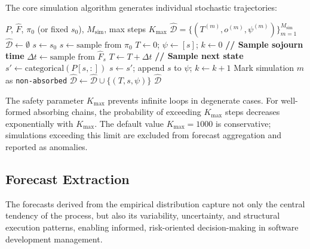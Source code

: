 The core simulation algorithm generates individual stochastic trajectories:

\begin{algorithm}[htbp]
\caption{Process-Aware Monte Carlo Simulation (Full Specification)}
\label{alg:mc-full}
\begin{algorithmic}[1]
\REQUIRE $P$, $\hat{F}$, $\pi_0$ (or fixed $s_0$), $M_{\text{sim}}$, 
    max steps $K_{\max}$
\ENSURE $\hat{\mathcal{D}} = \{(T^{(m)}, o^{(m)}, \psi^{(m)})\}_{m=1}^{M_{\text{sim}}}$
\STATE $\hat{\mathcal{D}} \gets \emptyset$
        \STATE $s \gets s_0$
    \ELSE
        \STATE $s \gets \text{sample from } \pi_0$ 
    \ENDIF
    \STATE $T \gets 0$; $\psi \gets [s]$; $k \gets 0$
        \STATE \textbf{// Sample sojourn time}
        \STATE $\Delta t \gets \text{sample from } \hat{F}_s$ 
        \STATE $T \gets T + \Delta t$
        \STATE \textbf{// Sample next state}
        \STATE $s' \gets \text{categorical}(P[s, :])$
        \STATE $s \gets s'$; append $s$ to $\psi$; $k \gets k + 1$
    \ENDWHILE
        \STATE Mark simulation $m$ as \texttt{non-absorbed} 
    \ENDIF
    \STATE $\hat{\mathcal{D}} \gets \hat{\mathcal{D}} \cup 
        \{(T, s, \psi)\}$
\ENDFOR
\RETURN $\hat{\mathcal{D}}$
\end{algorithmic}
\end{algorithm}

The safety parameter $K_{\max}$ prevents infinite loops in degenerate 
cases. For well-formed absorbing chains, the probability of exceeding 
$K_{\max}$ steps decreases exponentially with $K_{\max}$. The default 
value $K_{\max} = 1000$ is conservative; simulations exceeding this 
limit are excluded from forecast aggregation and reported as anomalies.


\subsection{Forecast Extraction}
\label{sec:s4-forecasts}

The forecasts derived from the empirical distribution capture not only the central tendency of the process, but also its variability, uncertainty, and structural execution patterns, enabling informed, risk-oriented decision-making in software development management.

